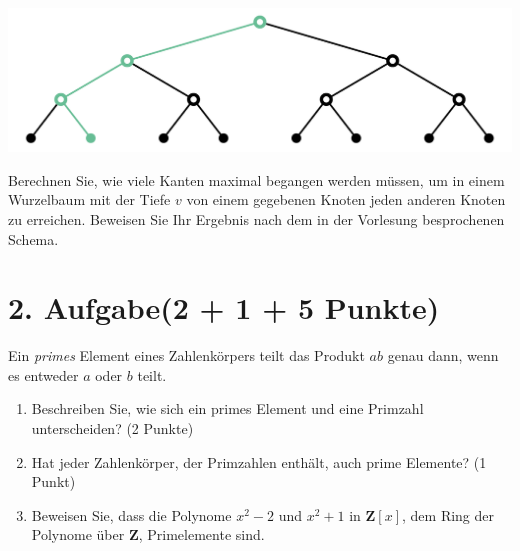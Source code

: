 \documentclass[11pt, a4paper]{article}
\begin{document}
\vspace{6mm}

\begin{center}
    \includegraphics[width=.9\textwidth]{../assets/graph}
\end{center}

Berechnen Sie, wie viele Kanten maximal begangen werden müssen, um in einem Wurzelbaum mit der Tiefe $v$ von einem gegebenen Knoten jeden anderen Knoten zu erreichen. Beweisen Sie Ihr Ergebnis nach dem in der Vorlesung besprochenen Schema.

\section*{2. Aufgabe\hfill\textnormal{\normalsize (2 + 1 + 5 Punkte)}}

Ein \emph{primes} Element eines Zahlenkörpers teilt das Produkt $ab$ genau dann, wenn es entweder $a$ oder $b$ teilt.

\begin{enumerate}
    \item Beschreiben Sie, wie sich ein primes Element und eine Primzahl unterscheiden? (2 Punkte)
    \item Hat jeder Zahlenkörper, der Primzahlen enthält, auch prime Elemente? (1 Punkt)
    \item Beweisen Sie, dass die Polynome $x^2 - 2$ und $x^2 + 1$ in $\textbf{Z}[x]$, dem Ring der Polynome über $\textbf{Z}$, Primelemente sind.
\end{enumerate}
\end{document}
